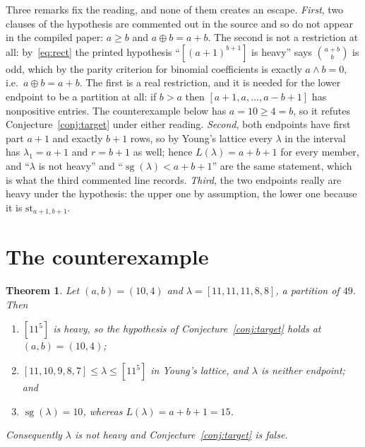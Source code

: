 \documentclass[11pt]{amsart}
\newtheorem{theorem}{Theorem}
\theoremstyle{definition}
\theoremstyle{remark}
\newcommand{\br}[1]{[#1]}
\newcommand{\sgv}{\operatorname{sg}}
\newcommand{\str}{\mathrm{st}}
\begin{document}
Three remarks fix the reading, and none of them creates an escape.
\emph{First}, two clauses of the hypothesis are commented out in the source and
so do not appear in the compiled paper: $a\ge b$ and $a\oplus b=a+b$. The
second is not a restriction at all: by~\eqref{eq:rect} the printed hypothesis
``$\br{(a+1)^{b+1}}$ is heavy'' says $\binom{a+b}{b}$ is odd, which by the
parity criterion for binomial coefficients \cite{Fine} is exactly
$a\wedge b=0$, i.e.\ $a\oplus b=a+b$. The first is a real restriction, and it
is needed for the lower endpoint to be a partition at all: if $b>a$ then
$\br{a+1,a,\dots,a-b+1}$ has nonpositive entries. The counterexample below has
$a=10\ge4=b$, so it refutes Conjecture~\ref{conj:target} under either reading.
\emph{Second}, both endpoints have first part $a+1$ and exactly $b+1$ rows, so
by Young's lattice every $\lambda$ in the interval has $\lambda_1=a+1$ and
$r=b+1$ as well; hence $L(\lambda)=a+b+1$ for every member, and ``$\lambda$ is
not heavy'' and ``$\sgv(\lambda)<a+b+1$'' are the same statement, which is what
the third commented line records.
\emph{Third}, the two endpoints really are heavy under the hypothesis: the
upper one by assumption, the lower one because it is $\str_{a+1,b+1}$.

\section{The counterexample}

\begin{theorem}\label{thm:main}
Let $(a,b)=(10,4)$ and $\lambda=\br{11,11,11,8,8}$, a partition of $49$. Then
\begin{enumerate}
\item $\br{11^5}$ is heavy, so the hypothesis of
  Conjecture~\ref{conj:target} holds at $(a,b)=(10,4)$;
\item $\br{11,10,9,8,7}\le\lambda\le\br{11^5}$ in Young's lattice, and
  $\lambda$ is neither endpoint; and
\item $\sgv(\lambda)=10$, whereas $L(\lambda)=a+b+1=15$.
\end{enumerate}
Consequently $\lambda$ is not heavy and Conjecture~\ref{conj:target} is false.
\end{theorem}
\end{document}

